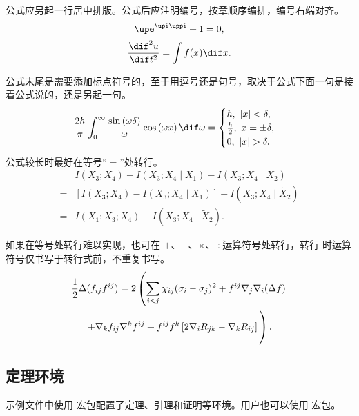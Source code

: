 公式应另起一行居中排版。公式后应注明编号，按章顺序编排，编号右端对齐。
\begin{equation}
  \upe^{\upi\uppi} + 1 = 0,
\end{equation}
\begin{equation}
  \frac{\dif^2 u}{\dif t^2} = \int f(x) \dif x.
\end{equation}

公式末尾是需要添加标点符号的，至于用逗号还是句号，取决于公式下面一句是接着公式说的，还是另起一句。
\begin{equation}
		\frac{2h}{\pi}\int_{0}^{\infty}\frac{\sin\left( \omega\delta \right)}{\omega}
		\cos\left( \omega x \right) \dif\omega = 
		\begin{cases}
				h, \ \left| x \right| < \delta, \\
				\frac{h}{2}, \ x = \pm \delta, \\
				0, \ \left| x \right| > \delta.
		\end{cases}
\end{equation}
公式较长时最好在等号“$=$”处转行。
\begin{align}
    & I (X_3; X_4) - I (X_3; X_4 \mid X_1) - I (X_3; X_4 \mid X_2) \nonumber \\
  = & [I (X_3; X_4) - I (X_3; X_4 \mid X_1)] - I (X_3; X_4 \mid \tilde{X}_2) \\
  = & I (X_1; X_3; X_4) - I (X_3; X_4 \mid \tilde{X}_2).
\end{align}

如果在等号处转行难以实现，也可在 $+$、$-$、$\times$、$\div$运算符号处转行，转行
时运算符号仅书写于转行式前，不重复书写。
\begin{multline}
  \frac{1}{2} \Delta (f_{ij} f^{ij}) =
    2 \left(\sum_{i<j} \chi_{ij}(\sigma_{i} - \sigma_{j})^{2}
    + f^{ij} \nabla_{j} \nabla_{i} (\Delta f) \right. \\
  \left. + \nabla_{k} f_{ij} \nabla^{k} f^{ij} +
    f^{ij} f^{k} \left[2\nabla_{i}R_{jk}
    - \nabla_{k} R_{ij} \right] \vphantom{\sum_{i<j}} \right).
\end{multline}

\subsection{定理环境}

示例文件中使用  宏包配置了定理、引理和证明等环境。用户也可以使用
 宏包。

